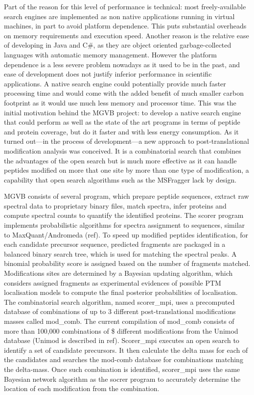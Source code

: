 \documentclass[sn-standardnature]{sn-jnl}%
\theoremstyle{thmstyleone}%
\theoremstyle{thmstyletwo}%
\theoremstyle{thmstylethree}%
\begin{document}
Part of the reason for this level of performance is technical: most freely-available search engines are implemented as non native applications running in virtual machines, in part to avoid platform dependence. This puts substantial overheads on memory requirements and execution speed. Another reason is the relative ease of developing in Java and C\#, as they are object oriented garbage-collected languages with automatic memory management. However the platform dependence is a less severe problem nowadays as it used to be in the past, and ease of development does not justify inferior performance in scientific applications. A native search engine could potentially provide much faster processing time and would come with the added benefit of much smaller carbon footprint as it would use much less memory and processor time. This was the initial motivation behind the MGVB project: to develop a native search engine that could perform as well as the state of the art programs in terms of peptide and protein coverage, but do it faster and with less energy consumption. As it turned out—in the process of development—a new approach to post-translational modification analysis was conceived. It is a combinatorial search that combines the advantages of the open search but is much more effective as it can handle peptides modified on more that one site by more than one type of modification, a capability that open search algorithms such as the MSFragger lack by design. 

MGVB consists of several program, which prepare peptide sequences, extract raw spectral data to proprietary binary files, match spectra, infer proteins and compute spectral counts to quantify the identified proteins. The scorer program implements probabilistic algorithms for spectra assignment to sequences, similar to MaxQuant/Andromeda (ref). To speed up modified peptides identification, for each candidate precursor sequence, predicted fragments are packaged in a balanced binary search tree, which is used for matching the spectral peaks. A binomial probability score is assigned based on the number of fragments matched. Modifications sites are determined by a Bayesian updating algorithm, which considers assigned fragments as experimental evidences of possible PTM localisation models to compute the final posterior probabilities of localisation. The combinatorial search algorithm, named scorer\_mpi, uses a precomputed database of combinations of up to 3 different post-translational modifications masses called mod\_comb. The current compilation of mod\_comb consists of more than 100,000 combinations of \$ different modifications from the Unimod database (Unimod is described in ref). Scorer\_mpi executes an open search to identify a set of candidate precursors. It then calculate the delta mass for each of the candidates and searches the mod-comb database for combinations matching the delta-mass. Once such combination is identified, scorer\_mpi uses the same Bayesian network algorithm as the socrer program to accurately determine the location of each modification from the combination. 
\end{document}
